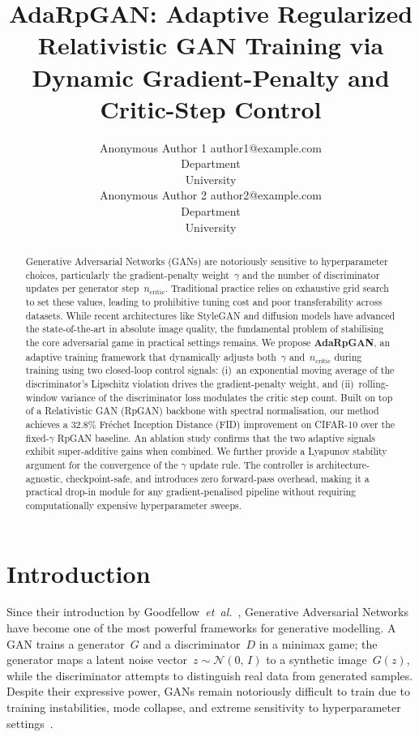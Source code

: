 \documentclass{article}
\title{AdaRpGAN: Adaptive Regularized Relativistic GAN Training via Dynamic Gradient-Penalty and Critic-Step Control}
\author{\name Anonymous Author 1 \email author1@example.com \\
      \addr Department \\
      University\\
      \AND
      \name Anonymous Author 2 \email author2@example.com \\
      \addr Department \\
      University}
\newcommand{\ncritic}{n_{\mathrm{critic}}}
\begin{document}
\maketitle

\begin{abstract}
Generative Adversarial Networks (GANs) are notoriously sensitive to hyperparameter choices, particularly the gradient-penalty weight~$\gamma$ and the number of discriminator updates per generator step~$\ncritic$. Traditional practice relies on exhaustive grid search to set these values, leading to prohibitive tuning cost and poor transferability across datasets. While recent architectures like StyleGAN and diffusion models have advanced the state-of-the-art in absolute image quality, the fundamental problem of stabilising the core adversarial game in practical settings remains. We propose \textbf{AdaRpGAN}, an adaptive training framework that dynamically adjusts both~$\gamma$ and~$\ncritic$ during training using two closed-loop control signals: (i)~an exponential moving average of the discriminator's Lipschitz violation drives the gradient-penalty weight, and (ii)~rolling-window variance of the discriminator loss modulates the critic step count. Built on top of a Relativistic GAN (RpGAN) backbone with spectral normalisation, our method achieves a 32.8\% Fr\'{e}chet Inception Distance (FID) improvement on CIFAR-10 over the fixed-$\gamma$ RpGAN baseline. An ablation study confirms that the two adaptive signals exhibit super-additive gains when combined. We further provide a Lyapunov stability argument for the convergence of the $\gamma$ update rule. The controller is architecture-agnostic, checkpoint-safe, and introduces zero forward-pass overhead, making it a practical drop-in module for any gradient-penalised pipeline without requiring computationally expensive hyperparameter sweeps.
\end{abstract}

\section{Introduction}
\label{sec:intro}

Since their introduction by Goodfellow~\textit{et~al.}~\cite{goodfellow2014generative}, Generative Adversarial Networks have become one of the most powerful frameworks for generative modelling. A GAN trains a generator~$G$ and a discriminator~$D$ in a minimax game; the generator maps a latent noise vector~$z\!\sim\!\mathcal{N}(0,\,I)$ to a synthetic image~$G(z)$, while the discriminator attempts to distinguish real data from generated samples. Despite their expressive power, GANs remain notoriously difficult to train due to training instabilities, mode collapse, and extreme sensitivity to hyperparameter settings~\cite{mescheder2018training}.
\end{document}
